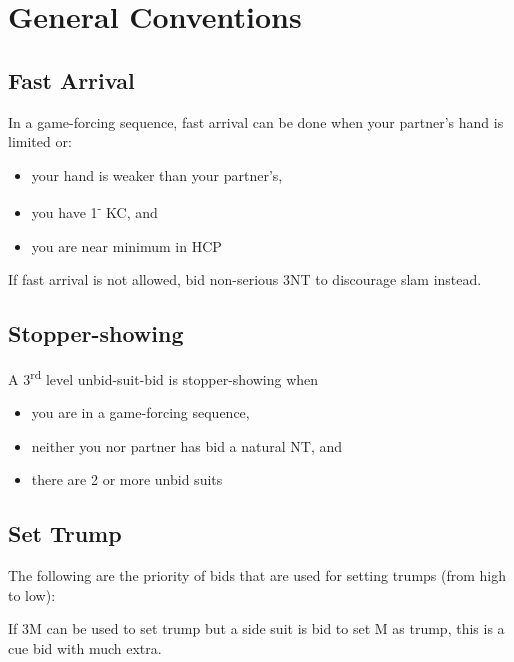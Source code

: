 \documentclass{article}
\renewcommand{\sp}{\ensuremath\spadesuit}
\newcommand{\he}{\ensuremath\heartsuit}
\newcommand{\di}{\ensuremath\diamondsuit}
\newcommand{\cl}{\ensuremath\clubsuit}
\newcommand{\nt}{\relsize{-1}NT\relsize{1}}
\newcommand{\down}{\textsuperscript{-}}
\begin{document}
\section{General Conventions}

\subsection{Fast Arrival}
In a game-forcing sequence, fast arrival can be done when your partner's hand is limited or:
\begin{itemize}
	\itemsep0em
	\item your hand is weaker than your partner's,
	\item you have 1\down{} KC, and
	\item you are near minimum in HCP
\end{itemize}
If fast arrival is not allowed, bid non-serious 3\nt{} to discourage slam instead.

\subsection{Stopper-showing}
A 3\textsuperscript{rd} level unbid-suit-bid is stopper-showing when
\begin{itemize}
	\itemsep0em
	\item you are in a game-forcing sequence,
	\item neither you nor partner has bid a natural \nt{}, and
	\item there are 2 or more unbid suits
\end{itemize}

\subsection{Set Trump}
The following are the priority of bids that are used for setting trumps (from high to low):
If 3M can be used to set trump but a side suit is bid to set M as trump, this is a cue bid with much extra.
\end{document}
